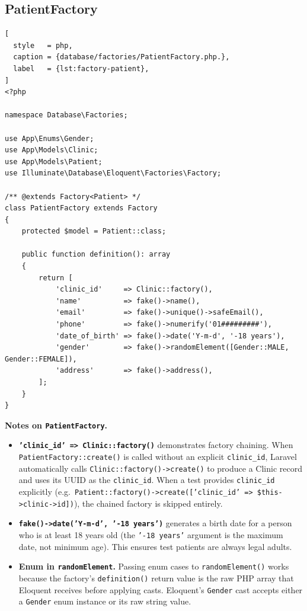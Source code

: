 \subsection{PatientFactory}

\begin{lstlisting}[
  style   = php,
  caption = {database/factories/PatientFactory.php.},
  label   = {lst:factory-patient},
]
<?php

namespace Database\Factories;

use App\Enums\Gender;
use App\Models\Clinic;
use App\Models\Patient;
use Illuminate\Database\Eloquent\Factories\Factory;

/** @extends Factory<Patient> */
class PatientFactory extends Factory
{
    protected $model = Patient::class;

    public function definition(): array
    {
        return [
            'clinic_id'     => Clinic::factory(),
            'name'          => fake()->name(),
            'email'         => fake()->unique()->safeEmail(),
            'phone'         => fake()->numerify('01#########'),
            'date_of_birth' => fake()->date('Y-m-d', '-18 years'),
            'gender'        => fake()->randomElement([Gender::MALE, Gender::FEMALE]),
            'address'       => fake()->address(),
        ];
    }
}
\end{lstlisting}

\textbf{Notes on \texttt{PatientFactory}.}

\begin{itemize}
  \item \textbf{\texttt{'clinic\_id' => Clinic::factory()}} demonstrates
    factory chaining. When \texttt{PatientFactory::create()} is called
    without an explicit \texttt{clinic\_id}, Laravel automatically
    calls \texttt{Clinic::factory()->create()} to produce a Clinic
    record and uses its UUID as the \texttt{clinic\_id}. When a test
    provides \texttt{clinic\_id} explicitly (e.g.\
    \texttt{Patient::factory()->create(['clinic\_id' => \$this->clinic->id])}),
    the chained factory is skipped entirely.

  \item \textbf{\texttt{fake()->date('Y-m-d', '-18 years')}} generates
    a birth date for a person who is at least 18 years old (the
    \texttt{'-18 years'} argument is the maximum date, not minimum
    age). This ensures test patients are always legal adults.

  \item \textbf{Enum in \texttt{randomElement}.} Passing enum cases
    to \texttt{randomElement()} works because the factory's
    \texttt{definition()} return value is the raw PHP array that
    Eloquent receives before applying casts. Eloquent's
    \texttt{Gender} cast accepts either a \texttt{Gender} enum
    instance or its raw string value.
\end{itemize}

